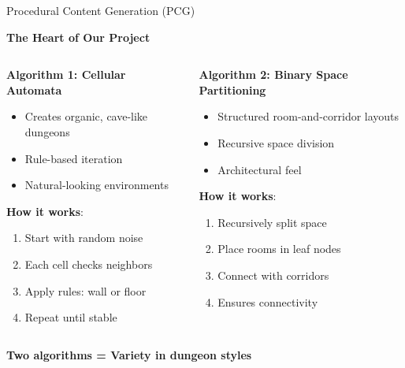 \documentclass{beamer}
\begin{document}
\begin{frame}{Procedural Content Generation (PCG)}
    \begin{center}
        \textbf{The Heart of Our Project}
    \end{center}

    \begin{columns}[T]
        \begin{column}{0.48\textwidth}
            \textbf{Algorithm 1: Cellular Automata}
            \begin{itemize}
                \item Creates organic, cave-like dungeons
                \item Rule-based iteration
                \item Natural-looking environments
            \end{itemize}

            \vspace{0.2cm}
            \textbf{How it works}:
            \begin{enumerate}\small
                \item Start with random noise
                \item Each cell checks neighbors
                \item Apply rules: wall or floor
                \item Repeat until stable
            \end{enumerate}
        \end{column}

        \begin{column}{0.48\textwidth}
            \textbf{Algorithm 2: Binary Space Partitioning}
            \begin{itemize}
                \item Structured room-and-corridor layouts
                \item Recursive space division
                \item Architectural feel
            \end{itemize}

            \vspace{0.2cm}
            \textbf{How it works}:
            \begin{enumerate}\small
                \item Recursively split space
                \item Place rooms in leaf nodes
                \item Connect with corridors
                \item Ensures connectivity
            \end{enumerate}
        \end{column}
    \end{columns}

    \vspace{0.3cm}
    \begin{center}
        \textcolor{ubburgundy}{\textbf{Two algorithms = Variety in dungeon styles}}
    \end{center}
\end{frame}
\end{document}
